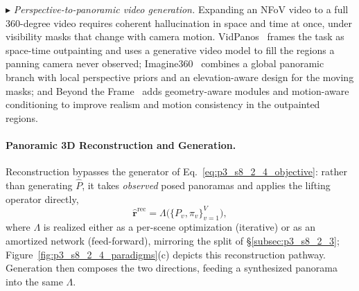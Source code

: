 $\blacktriangleright$ \textit{Perspective-to-panoramic video generation.} Expanding an NFoV video to a full 360-degree video requires coherent hallucination in space and time at once, under visibility masks that change with camera motion.
VidPanos~\cite{ma2024vidpanos} frames the task as space-time outpainting and uses a generative video model to fill the regions a panning camera never observed; Imagine360~\cite{tan2024imagine360} combines a global panoramic branch with local perspective priors and an elevation-aware design for the moving masks; and Beyond the Frame~\cite{beyondtheframe} adds geometry-aware modules and motion-aware conditioning to improve realism and motion consistency in the outpainted regions.


\paragraph{Panoramic 3D Reconstruction and Generation.}
Reconstruction bypasses the generator of Eq.~\eqref{eq:p3_s8_2_4_objective}: rather than generating $\hat{P}$, it takes \emph{observed} posed panoramas and applies the lifting operator directly,
\begin{equation}
\hat{\mathbf{r}}^{\text{rec}} = \Lambda\big(\{P_v, \pi_v\}_{v=1}^{V}\big),
\label{eq:p3_s8_2_4_recon}
\end{equation}
where $\Lambda$ is realized either as a per-scene optimization (iterative) or as an amortized network (feed-forward), mirroring the split of §\ref{subsec:p3_s8_2_3}; Figure~\ref{fig:p3_s8_2_4_paradigms}(c) depicts this reconstruction pathway.
Generation then composes the two directions, feeding a synthesized panorama into the same $\Lambda$.

